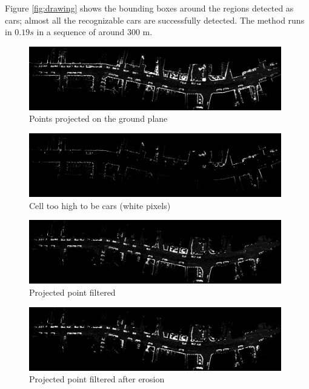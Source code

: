 Figure \ref{fig:drawing} shows the bounding boxes around the regions detected as cars; almost all the recognizable cars are successfully detected.
The method runs in $0.19s$ in a sequence of around $300$ m.

\begin{figure}[tp]
 \centering
 \includegraphics[width=0.98\textwidth]{./img/ch-laser/pointsprojected}
 \caption{Points projected on the ground plane}
 \label{fig:pointsprojected}
\end{figure}

\begin{figure}[tp]
 \centering
 \includegraphics[width=0.98\textwidth]{./img/ch-laser/heightimagePointsProjected_.png}
 \caption{Cell too high to be cars (white pixels)}
 \label{fig:heightfiltering}
\end{figure}

\begin{figure}[tp]
 \centering
 \includegraphics[width=0.98\textwidth]{./img/ch-laser/pointsprojectedFiltered.png}
 \caption{Projected point filtered}
 \label{fig:pointsprojectedFiltered}
\end{figure}

\begin{figure}[tp]
 \centering
 \includegraphics[width=0.98\textwidth]{./img/ch-laser/pointsprojectedEroded.png}
 \caption{Projected point filtered after erosion}
 \label{fig:pointsprojectedEroded}
\end{figure}

